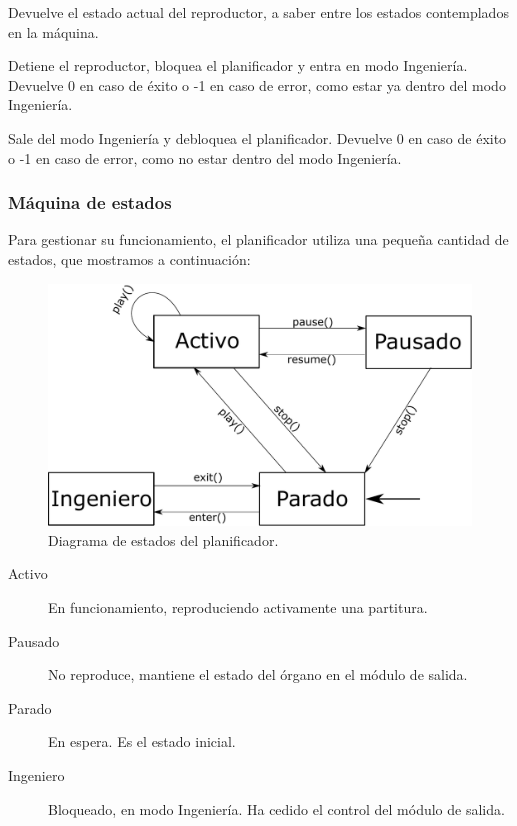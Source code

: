 \begin{description}[style=nextline]
	Devuelve el estado actual del reproductor, a saber entre los estados contemplados en la máquina.
	
	\item[player\_engineer\_enter () : \textit{dword}]
	Detiene el reproductor, bloquea el planificador y entra en modo Ingeniería. Devuelve 0 en caso de éxito o -1 en caso de error, como estar ya dentro del modo Ingeniería.
	
	\item[player\_engineer\_exit () : \textit{dword}]
	Sale del modo Ingeniería y debloquea el planificador. Devuelve 0 en caso de éxito o -1 en caso de error, como no estar dentro del modo Ingeniería.
	
\end{description}

\subsubsection{Máquina de estados}

Para gestionar su funcionamiento, el planificador utiliza una pequeña cantidad de estados, que mostramos a continuación:

\smallskip

\begin{figure}[H]
	\noindent \begin{centering}
		\includegraphics[width=\linewidth/2]{capitulo4/sched}
		\par\end{centering}
	\smallskip
	\caption{\label{fig:sched} Diagrama de estados del planificador.}
\end{figure} 

\smallskip

\begin{description}
	\item[Activo] En funcionamiento, reproduciendo activamente una partitura.
	\item[Pausado] No reproduce, mantiene el estado del órgano en el módulo de salida.
	\item[Parado] En espera. Es el estado inicial.
	\item[Ingeniero] Bloqueado, en modo Ingeniería. Ha cedido el control del módulo de salida.
\end{description}

